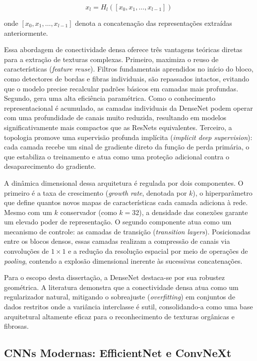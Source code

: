         $$x_l = H_l([x_0, x_1, \dots, x_{l-1}])$$
        
        onde $[x_0, x_1, \dots, x_{l-1}]$ denota a concatenação das representações extraídas anteriormente.

        Essa abordagem de conectividade densa oferece três vantagens teóricas diretas para a extração de texturas complexas. Primeiro, maximiza o reuso de características (\textit{feature reuse}). Filtros fundamentais aprendidos no início do bloco, como detectores de bordas e fibras individuais, são repassados intactos, evitando que o modelo precise recalcular padrões básicos em camadas mais profundas. Segundo, gera uma alta eficiência paramétrica. Como o conhecimento representacional é acumulado, as camadas individuais da DenseNet podem operar com uma profundidade de canais muito reduzida, resultando em modelos significativamente mais compactos que as ResNets equivalentes. Terceiro, a topologia promove uma supervisão profunda implícita (\textit{implicit deep supervision}): cada camada recebe um sinal de gradiente direto da função de perda primária, o que estabiliza o treinamento e atua como uma proteção adicional contra o desaparecimento do gradiente.

        A dinâmica dimensional dessa arquitetura é regulada por dois componentes. O primeiro é a taxa de crescimento (\textit{growth rate}, denotada por $k$), o hiperparâmetro que define quantos novos mapas de características cada camada adiciona à rede. Mesmo com um $k$ conservador (como $k=32$), a densidade das conexões garante um elevado poder de representação. O segundo componente atua como um mecanismo de controle: as camadas de transição (\textit{transition layers}). Posicionadas entre os blocos densos, essas camadas realizam a compressão de canais via convoluções de $1 \times 1$ e a redução da resolução espacial por meio de operações de \textit{pooling}, contendo a explosão dimensional inerente às sucessivas concatenações.

        Para o escopo desta dissertação, a DenseNet destaca-se por sua robustez geométrica. A literatura demonstra que a conectividade densa atua como um regularizador natural, mitigando o sobreajuste (\textit{overfitting}) em conjuntos de dados restritos onde a variância interclasse é sutil, consolidando-a como uma base arquitetural altamente eficaz para o reconhecimento de texturas orgânicas e fibrosas.



\subsection{CNNs Modernas: EfficientNet e ConvNeXt}

